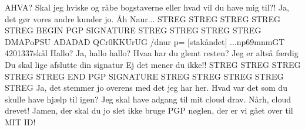 \documentclass[a4paper,11pt]{article}
\begin{document}
\begin{sketch}
 AHVA? Skal jeg hviske og råbe bogstaverne eller hvad vil du have mig til?!
 Ja, det gør vores andre kunder jo.
 Åh Naur...
  STREG STREG STREG STREG STREG BEGIN PGP SIGNATURE STREG STREG STREG STREG
DMAPoPSU ADADAD QCr0KKUrUG /dnur p=
[stakåndet] ...np69mnmGT 4201337skål
 Hallo?
 Ja, hallo hallo?
 Hvaa har du glemt resten?
 Jeg er altså færdig
 Du skal lige afslutte din signatur
 Ej det mener du ikke!!
STREG STREG STREG STREG STREG END PGP SIGNATURE STREG STREG STREG STREG STREG
 Ja, det stemmer jo overens med det jeg har her. Hvad var det som du skulle have hjælp til igen?
 Jeg skal have adgang til mit cloud drav.
 Nårh, cloud drevet! Jamen, der skal du jo slet ikke bruge PGP nøglen, der er vi gået over til MIT ID!

\end{sketch}
\end{document}
